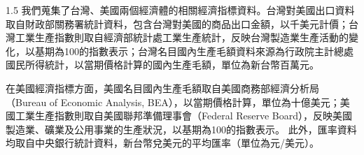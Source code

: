 \documentclass[a4paper,12pt]{article}
\begin{document}
\begin{spacing}{1.5}
我們蒐集了台灣、美國兩個經濟體的相關經濟指標資料。台灣對美國出口資料取自財政部關務署統計資料，包含台灣對美國的商品出口金額，以千美元計價；台灣工業生產指數則取自經濟部統計處工業生產統計，反映台灣製造業生產活動的變化，以基期為100的指數表示；台灣名目國內生產毛額資料來源為行政院主計總處國民所得統計，以當期價格計算的國內生產毛額，單位為新台幣百萬元。

在美國經濟指標方面，美國名目國內生產毛額取自美國商務部經濟分析局（Bureau of Economic Analysis, BEA），以當期價格計算，單位為十億美元；美國工業生產指數則取自美國聯邦準備理事會（Federal Reserve Board），反映美國製造業、礦業及公用事業的生產狀況，以基期為100的指數表示。
此外，匯率資料均取自中央銀行統計資料，新台幣兌美元的平均匯率（單位為元/美元）。
\end{spacing}

\vspace{-0.5cm}
\end{document}
